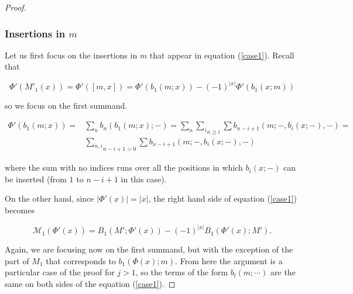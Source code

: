 \documentclass[join.tex]{subfiles}
\begin{document}
\begin{proof}
\subsubsection*{Insertions in $m$}

Let us first focus on the insertions in $m$ that appear in equation (\ref{case1}). Recall that 

\begin{equation}\label{phim}
\Phi'(M'_1(x))=\Phi'([m,x])=\Phi'(b_1(m;x))-(-1)^{|x|}\Phi'(b_1(x;m))
\end{equation}

so we focus on the first summand. 

\begin{align*}
\Phi'(b_1(m;x))=&\sum_n b_n(b_1(m;x);-)=\sum_n \underset{n\geq i}{\sum_i} \sum b_{n-i+1}(m;-, b_i(x;-),-)=\\
&\underset{n-i+1> 0}{\sum_{n,i}}\sum b_{n-i+1}(m;-, b_i(x;-),-)
\end{align*}

where the sum with no indices runs over all the positions in which $b_i(x;-)$ can be inserted (from $1$ to $n-i+1$ in this case). 


On the other hand, since $|\Phi'(x)|=|x|$, the right hand side of equation (\ref{case1}) becomes

\begin{equation}\label{mphi}
\mathcal{M}_1(\Phi'(x))=B_1(M';\Phi'(x))-(-1)^{|x|}B_1(\Phi'(x);M').
\end{equation}

Again, we are focusing now on the first summand, but with the exception of the part of $M_1$ that corresponds to $b_1(\Phi(x);m)$. From here the argument is a particular case of the proof for $j>1$, so the terms of the form $b_l(m;\cdots)$ are the same on both sides of the equation (\ref{case1}). 

%
%
%
%



\end{proof}
\end{document}
